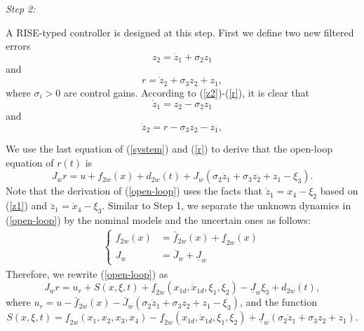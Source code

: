 \documentclass{article}
\begin{document}
	\begin{flushleft}
		\textit{Step 2:}
	\end{flushleft}	
	
	A RISE-typed controller is designed at this step. First we define two new filtered errors
	\begin{equation}
	z_{2} = \dot{z}_{1} + \sigma_{2}z_{1} \label{z2}
	\end{equation}
	and
	\begin{equation}
	r = \dot{z}_{2} + \sigma_{3}z_{2} + z_{1}, \label{r}
	\end{equation}
	where $\sigma_{i}>0$ are control gains. According to (\ref{z2})-(\ref{r}), it is clear that
	\begin{equation}
	\dot{z}_{1} = z_{2} - \sigma_{2}z_{1} \label{z1dot2}
	\end{equation}
	and
	\begin{equation}
	\dot{z}_{2} = r-\sigma_{3}z_{2} - z_{1}, \label{z2dot}
	\end{equation}
	
	We use the last equation of (\ref{system}) and (\ref{r}) to derive that the open-loop equation of $r(t)$ is
	\begin{equation}
	J_{w}r = u + f_{2w}(x) + d_{2w}(t) + J_{w}\left(\sigma_{2}\dot{z}_{1}+\sigma_{3}z_{2}+z_{1}-\xi_{3}\right). \label{open-loop}
	\end{equation}
	Note that the derivation of (\ref{open-loop}) uses the facts that $\dot{z}_{1} = x_{4}-\xi_{2}$ based on (\ref{z1}) and $\ddot{z}_{1} = \dot{x}_{4} - \xi_{3}$. Similar to Step 1, we separate the unknown dynamics in (\ref{open-loop}) by the nominal models and the uncertain ones as follows:
	\begin{align}
	\begin{cases}
	f_{2w}(x) &= \bar{f}_{2w}(x) + \underline{f}_{2w}(x) \\
	J_{w} &= \bar{J}_{w} + \underline{J}_{w}
	\end{cases}
	\end{align}
	Therefore, we rewrite (\ref{open-loop}) as
	\begin{equation}
	J_{w}r = u_{r} + S\left(x,\xi,t\right) + \underline{f}_{2w}\left(x_{1d},\dot{x}_{1d},\xi_{1},\xi_{2}\right) - \underline{J}_{w}\xi_{3} + d_{2w}(t), \label{open-loop2}
	\end{equation}
	where $u_{r} = u - \bar{f}_{2w}(x) - \bar{J}_{w}\left(\sigma_{2}\dot{z}_{1}+\sigma_{3}z_{2}+z_{1}-\xi_{3}\right)$, and the function 
	\begin{equation}
	S\left(x,\xi,t\right) = \underline{f}_{2w}\left(x_{1},x_{2},x_{3},x_{4}\right) - \underline{f}_{2w}\left(x_{1d},\dot{x}_{1d},\xi_{1},\xi_{2}\right) + \underline{J}_{w}\left(\sigma_{2}\dot{z}_{1}+\sigma_{3}z_{2}+z_{1}\right). \label{S}
	\end{equation}
\end{document}
